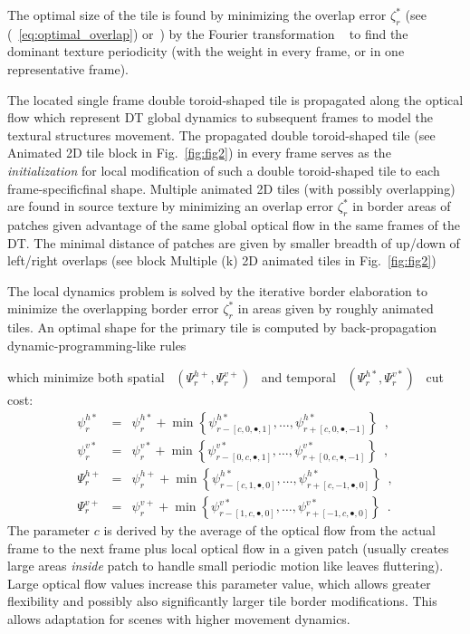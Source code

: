 \documentclass{\adsty/acmsiggraph}
\begin{document}
The optimal size of the tile is found by minimizing the
overlap error
$\zeta_{r}^*$ (see (~\ref{eq:optimal_overlap}) or~\cite{HaiHat05}) by the Fourier transformation
~\cite{HaiHat05} to find the dominant
texture periodicity (with the weight in every frame, or in one
representative frame).

The located single frame double toroid-shaped tile  is propagated along the optical flow which represent DT global dynamics  to subsequent frames 
 to model the textural structures movement.
The propagated double toroid-shaped tile (see Animated 2D tile block in Fig.~\ref{fig:fig2}) in every frame serves as the \emph{initialization}
for local modification of such a double toroid-shaped tile to each frame-specificfinal shape.
Multiple animated 2D tiles (with possibly overlapping) are found in source texture by minimizing an overlap error $ \zeta_{r}^* $ in border areas of patches given advantage of the same global optical flow in the same frames of the  DT. 
The minimal distance of patches are given by smaller breadth of up/down of left/right overlaps (see block Multiple (k) 2D animated tiles in Fig.~\ref{fig:fig2})

The local dynamics problem is solved by the iterative border elaboration   to  minimize the overlapping border error $ \zeta_{r}^* $  in areas given by roughly animated tiles.	
An optimal shape for the primary tile is computed by back-propagation  dynamic-programming-like rules

which minimize both spatial \ $(\Psi_{r}^{h+},\Psi_{r}^{v+})$ \  and temporal
\ $(\Psi_{r}^{h*},\Psi_{r}^{v*})$ \ cut cost:
\begin{eqnarray*}
\psi_{r}^{h*} &=&
	 \psi_{r}^{h*} +  {\min\left\{\psi_{r-[c,0,\bullet,1]}^{h*},\ldots,
	 \psi_{r+[c,0,\bullet,-1]}^{h*} \right\}}\enspace , \label{oc1} \\
\psi_{r}^{v*} & = & \psi_{r}^{v*} +  {\min\left\{\psi_{r-[0,c,\bullet,1]}^{v*},\ldots,
		 \psi_{r+[0,c,\bullet,-1]}^{v*} \right\}}\enspace ,  \label{oc2} \\					
\Psi_{r}^{h+} & = & \psi_{r}^{h+}  + \min\left\{\psi_{r-[c,1,\bullet,0]}^{h*},\ldots,
		  \psi_{r+[c,-1,\bullet,0]}^{h*} \right\}\enspace , \label{oc3} \\
 \Psi_{r}^{v+} & = & \psi_{r}^{v+}  + \min\left\{\psi_{r-[1,c,\bullet,0]}^{v*},\ldots,
  \psi_{r+[-1,c,\bullet,0]}^{v*} \right\}\enspace . \label{oc4}
\end{eqnarray*}
The parameter $c$ is derived by the average of the optical flow from the actual frame to the next frame plus local optical flow in a given patch (usually creates large areas \emph{inside} patch to handle small periodic motion like leaves fluttering). 
Large optical flow values increase  this parameter value, which allows  greater flexibility and  possibly also significantly larger tile border modifications. This allows  adaptation for  scenes with higher movement dynamics.
	
\end{document}
